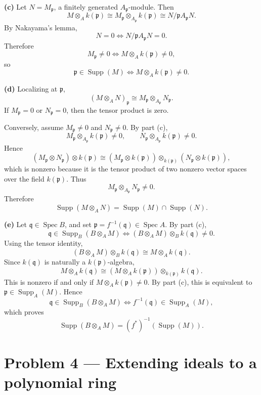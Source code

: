 \documentclass[12pt,a4paper]{article}
\theoremstyle{plain}
\theoremstyle{definition}      %
\begin{document}
	\textbf{(c)}
	Let \(N=M_{\mathfrak p}\), a finitely generated \(A_{\mathfrak p}\)-module.
	Then
	\[
	M\otimes_A k(\mathfrak p)
	\cong M_{\mathfrak p}\otimes_{A_{\mathfrak p}} k(\mathfrak p)
	\cong N/\mathfrak p A_{\mathfrak p}N.
	\]
	By Nakayama's lemma,
	\[
	N=0 \iff N/\mathfrak p A_{\mathfrak p}N=0.
	\]
	Therefore
	\[
	M_{\mathfrak p}\neq 0 \iff M\otimes_A k(\mathfrak p)\neq 0,
	\]
	so
	\[
	\boxed{\mathfrak p\in \operatorname{Supp}(M)\iff M\otimes_A k(\mathfrak p)\neq 0.}
	\]
	
	\textbf{(d)}
	Localizing at \(\mathfrak p\),
	\[
	(M\otimes_A N)_{\mathfrak p}\cong M_{\mathfrak p}\otimes_{A_{\mathfrak p}} N_{\mathfrak p}.
	\]
	If \(M_{\mathfrak p}=0\) or \(N_{\mathfrak p}=0\), then the tensor product is zero.
	
	Conversely, assume \(M_{\mathfrak p}\neq 0\) and \(N_{\mathfrak p}\neq 0\).
	By part (c),
	\[
	M_{\mathfrak p}\otimes_{A_{\mathfrak p}} k(\mathfrak p)\neq 0,
	\qquad
	N_{\mathfrak p}\otimes_{A_{\mathfrak p}} k(\mathfrak p)\neq 0.
	\]
	Hence
	\[
	(M_{\mathfrak p}\otimes N_{\mathfrak p})\otimes k(\mathfrak p)
	\cong
	(M_{\mathfrak p}\otimes k(\mathfrak p))
	\otimes_{k(\mathfrak p)}
	(N_{\mathfrak p}\otimes k(\mathfrak p)),
	\]
	which is nonzero because it is the tensor product of two nonzero vector spaces over the field \(k(\mathfrak p)\).
	Thus
	\[
	M_{\mathfrak p}\otimes_{A_{\mathfrak p}} N_{\mathfrak p}\neq 0.
	\]
	Therefore
	\[
	\boxed{\operatorname{Supp}(M\otimes_A N)=\operatorname{Supp}(M)\cap \operatorname{Supp}(N).}
	\]
	
	\textbf{(e)}
	Let \(\mathfrak q\in \operatorname{Spec}B\), and set \(\mathfrak p=f^{-1}(\mathfrak q)\in \operatorname{Spec}A\).
	By part (c),
	\[
	\mathfrak q\in \operatorname{Supp}_B(B\otimes_A M)
	\iff
	(B\otimes_A M)\otimes_B k(\mathfrak q)\neq 0.
	\]
	Using the tensor identity,
	\[
	(B\otimes_A M)\otimes_B k(\mathfrak q)\cong M\otimes_A k(\mathfrak q).
	\]
	Since \(k(\mathfrak q)\) is naturally a \(k(\mathfrak p)\)-algebra,
	\[
	M\otimes_A k(\mathfrak q)
	\cong
	(M\otimes_A k(\mathfrak p))\otimes_{k(\mathfrak p)} k(\mathfrak q).
	\]
	This is nonzero if and only if \(M\otimes_A k(\mathfrak p)\neq 0\).
	By part (c), this is equivalent to \(\mathfrak p\in \operatorname{Supp}_A(M)\).
	Hence
	\[
	\mathfrak q\in \operatorname{Supp}_B(B\otimes_A M)
	\iff
	f^{-1}(\mathfrak q)\in \operatorname{Supp}_A(M),
	\]
	which proves
	\[
	\boxed{\operatorname{Supp}(B\otimes_A M)=(f^*)^{-1}(\operatorname{Supp}(M)).}
	\]
	
	\section*{Problem 4 --- Extending ideals to a polynomial ring}
	
\end{document}
